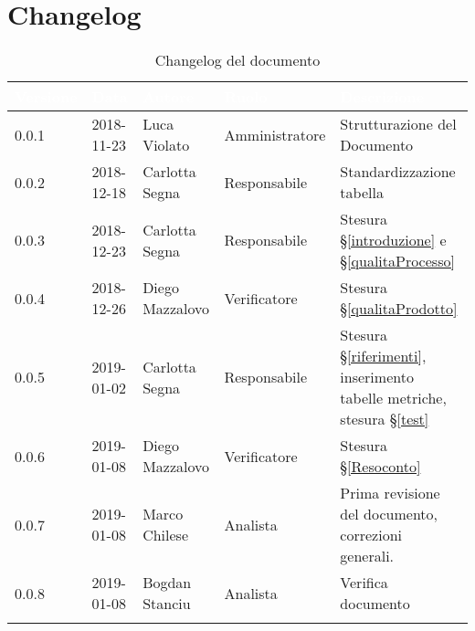 \section{Changelog}

\begin{center}
\begin{longtable}[c]{|m{}|m{}|m{}|m{}|p{}|}
\hline
\rowcolor{bluelogo}\textbf{\textcolor{white}{Versione}} & \textbf{\textcolor{white}{Data}} & \textbf{\textcolor{white}{Autore}} & \textbf{\textcolor{white}{Ruolo}} & \textbf{\textcolor{white}{Descrizione}}\\
\hline \hline
\endfirsthead
0.0.1 & 2018-11-23 & Luca Violato & Amministratore & Strutturazione del Documento \\
\hline
\rowcolor{grigio} 0.0.2 & 2018-12-18 & Carlotta Segna & Responsabile & Standardizzazione tabella \\
\hline
0.0.3 & 2018-12-23 & Carlotta Segna & Responsabile & Stesura §\ref{introduzione} e §\ref{qualitaProcesso} \\
\hline
\rowcolor{grigio} 0.0.4 & 2018-12-26 & Diego Mazzalovo & Verificatore & Stesura §\ref{qualitaProdotto} \\
\hline
0.0.5 & 2019-01-02 & Carlotta Segna & Responsabile & Stesura §\ref{riferimenti}, inserimento tabelle metriche, stesura §\ref{test} \\
\hline
\rowcolor{grigio}0.0.6 & 2019-01-08 & Diego Mazzalovo & Verificatore & Stesura §\ref{Resoconto}\\
\hline
0.0.7 & 2019-01-08 & Marco Chilese & Analista & Prima revisione del documento, correzioni generali.\\
\hline
0.0.8 & 2019-01-08 & Bogdan Stanciu &  Analista & Verifica documento \\
\hline

\caption{Changelog del documento}
\end{longtable}
\end{center}